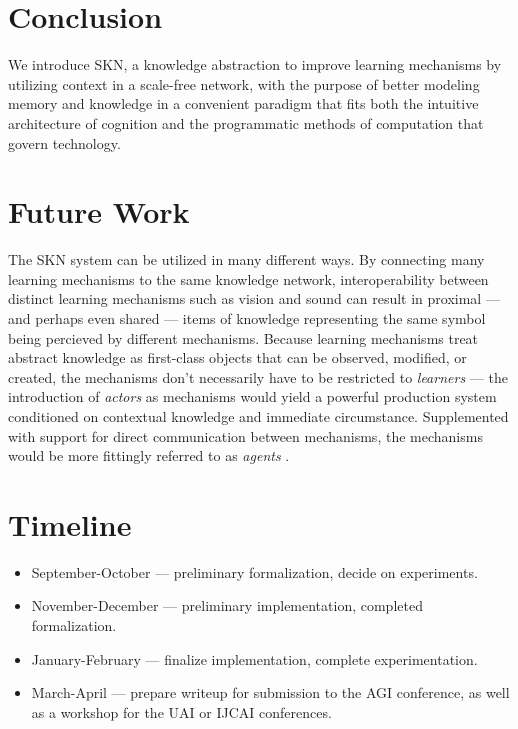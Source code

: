 \documentclass[11pt,letterpaper]{article}
\begin{document}
\section{Conclusion}

We introduce SKN, a knowledge abstraction to improve learning mechanisms by
utilizing context in a scale-free network, with the purpose of better
modeling memory and knowledge in a convenient paradigm that fits both the
intuitive architecture of cognition and the programmatic methods of
computation that govern technology.


\section{Future Work}

The SKN system can be utilized in many different ways. By connecting many
learning mechanisms to the same knowledge network, interoperability between
distinct learning mechanisms such as vision and sound can result in proximal
--- and perhaps even shared --- items of knowledge representing the same
symbol being percieved by different mechanisms. Because learning mechanisms
treat abstract knowledge as first-class objects that can be observed,
modified, or created, the mechanisms don't necessarily have to be restricted
to \emph{learners} --- the introduction of \emph{actors} as mechanisms would
yield a powerful production system conditioned on contextual knowledge and
immediate circumstance. Supplemented with support for direct communication
between mechanisms, the mechanisms would be more fittingly referred to as
\emph{agents} \cite{minsky88}.


\section{Timeline}

\begin{itemize}
  \item September-October --- preliminary formalization, decide on
    experiments.
  \item November-December --- preliminary implementation, completed
    formalization.
  \item January-February --- finalize implementation, complete
    experimentation.
  \item March-April --- prepare writeup for submission to the AGI
    conference, as well as a workshop for the UAI or IJCAI conferences.
\end{itemize}
\end{document}
